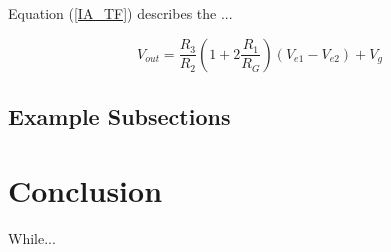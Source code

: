 \documentclass[journal]{../templates/IEEEtran}
\begin{document}
Equation (\ref{IA_TF}) describes the ...

\begin{equation}
V_{out} = \frac{R_3}{R_2}\left(1+2\frac{R_1}{R_G}\right)(V_{e1}-V_{e2})+V_g
\label{IA_TF}
\end{equation}

\newpage %

\subsection{Example Subsections}

\section{Conclusion} %

While...

\clearpage
{} %
\nocite{*} %


\end{document}
